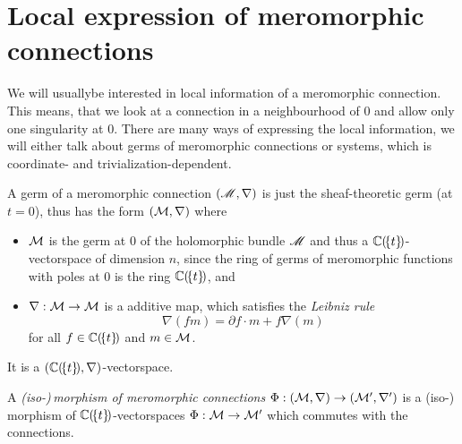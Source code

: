 \section{Local expression of meromorphic connections}
\begin{comment}
  \cite[28]{sabbah2007isomonodromic}, \cite[2]{thboalch} and
  \cite[11]{babbitt1989local}
\end{comment}
We will usually\TODO[only?] be interested in local information of a meromorphic
connection.  This means, that we look at a connection in a neighbourhood of $0$
and allow only one singularity at $0$.
There are many ways of expressing the local information, we will either talk
about germs of meromorphic connections or systems, which is coordinate-
and trivialization-dependent.
\begin{prop}
  A germ of a meromorphic connection $(\mathscr{M},\nabla)$ is just the sheaf-theoretic
  germ (at $t=0$), thus has the form $(\mathcal{M},\nabla)$ where
  \begin{itemize}
    \item $\mathcal{M}$ is the germ at $0$ of the holomorphic bundle $\mathscr{M}$ and thus a
      $\mathbb{C}(\!\{t\}\!)$-vectorspace of dimension $n$, since the ring of germs of
      meromorphic functions with poles at $0$ is the ring $\mathbb{C}(\!\{t\}\!)$, and
    \item $\nabla:\mathcal{M}\to \mathcal{M}$  is a additive map, which
      satisfies the \emph{Leibniz rule}
      \[
        \nabla(fm)=\partial f\cdot m + f\nabla(m)
      \]
      for all $f\in\mathbb{C}(\!\{t\}\!)$ and $m\in \mathcal{M}$.
  \end{itemize}
  \begin{s-rem}
    It is a $(\mathbb{C}(\!\{t\}\!),\nabla)$-vectorspace.
  \end{s-rem}
  \begin{comment}
    \begin{s-rem}
      Loday-Richaud calls this in \cite[Def.4.2.1]{Loday2014} a
      \emph{differential module}.
    \end{s-rem}
  \end{comment}
\end{prop}
\begin{defn}
  A \emph{(iso-)\,morphism of meromorphic connections}
  $\Phi:(\mathcal{M},\nabla)\to(\mathcal{M}',\nabla')$ is a (iso-)\,morphism of
  $\mathbb{C}(\!\{t\}\!)$-vectorspaces $\Phi:\mathcal{M}\to\mathcal{M}'$ which commutes with the
  connections.
\end{defn}
